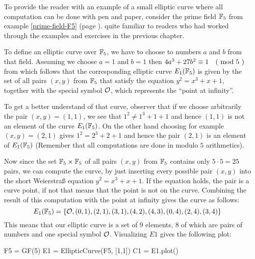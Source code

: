 \begin{example}\label{E1F5}To provide the reader with an example of a small elliptic curve where all computation can be done with pen and paper, consider the prime field $\mathbb{F}_5$ from example \ref{prime-field-F5} (page \pageref{prime-field-F5}).  quite familiar  to readers who had worked through the examples and exercises in the previous chapter.

To define an elliptic curve over $\mathbb{F}_5$, we have to choose to numbers $a$ and $b$ from that field. Assuming we choose $a=1$ and $b=1$ then $4a^3+ 27b^2 \equiv 1 \quad \text{( mod } 5 \text{ )}$ from which follows that the corresponding elliptic curve $E_1(\mathbb{F}_5)$ is given by the set of all pairs $(x,y)$ from $\mathbb{F}_5$ that satisfy the equation $y^2=x^3+x+1$, together with the special symbol $\mathcal{O}$, which represents the ``point at infinity''. 

To get a better understand of that curve, observer that if we choose arbitrarily the pair $(x,y)=(1,1)$, we see that $1^2 \neq 1^3+1 + 1$ and hence $(1,1)$ is not an element of the curve $E_1(\mathbb{F}_5)$. On the other hand choosing for example $(x,y)=(2,1)$ gives $1^2 = 2^3 + 2 + 1$ and hence the pair $(2,1)$ is an element of $E_1(\mathbb{F}_5)$ (Remember that all computations are done in modulo $5$ arithmetics).

Now since the set $\mathbb{F}_5\times \mathbb{F}_5$ of all pairs $(x,y)$ from $\mathbb{F}_5$ contains only $5\cdot 5=25$ pairs, we can compute the curve, by just inserting every possible pair $(x,y)$ into the short Weierstraß equation $y^2 = x^3 + x +1$. If the equation holds, the pair is a curve point, if not that means that the point is not on the curve. Combining the result of this computation with the point at infinity gives the curve as follows:
$$
E_1(\mathbb{F}_5) = \{\mathcal{O}, (0,1),(2,1),(3,1),(4,2),(4,3),(0,4),(2,4),(3,4)\}
$$
This means that our elliptic curve is a set of $9$ elements, $8$ of which are pairs of numbers and one special symbol $\mathcal{O}$. Visualizing $E1$ gives the following plot:
\begin{sagesilent}
F5 = GF(5)
E1 = EllipticCurve(F5, [1,1])
C1 = E1.plot()
\end{sagesilent}
\begin{center} 
\end{center}
\end{example}
